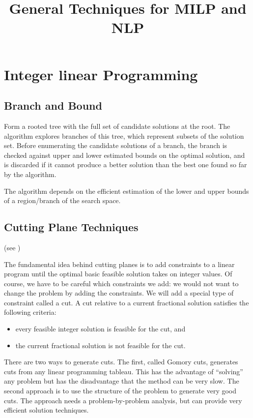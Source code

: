 \documentclass{article}
\title{\textbf{General Techniques for MILP and NLP}}
\begin{document}
\maketitle

\section{Integer linear Programming}
\subsection{Branch and Bound}
Form a rooted tree with the full set of candidate solutions at the root. The algorithm explores branches of this tree, which represent subsets of the solution set. Before enumerating the candidate solutions of a branch, the branch is checked against upper and lower estimated bounds on the optimal solution, and is discarded if it cannot produce a better solution than the best one found so far by the algorithm.

The algorithm depends on the efficient estimation of the lower and upper bounds of a region/branch of the search space.

\subsection{Cutting Plane Techniques}
(see \cite{cuttingplane98})

The fundamental idea behind cutting planes is to add constraints to a linear program until the optimal basic feasible solution takes on integer values. Of course, we have to be careful which constraints we add: we would not want to change the problem by adding the constraints. We will add a special type of constraint called a cut. A cut relative to a current fractional solution satisfies the following criteria:
\begin{itemize}
\item     every feasible integer solution is feasible for the cut, and
\item     the current fractional solution is not feasible for the cut. 
\end{itemize}

There are two ways to generate cuts. The first, called Gomory cuts, generates cuts from any linear programming tableau. This has the advantage of ``solving'' any problem but has the disadvantage that the method can be very slow. The second approach is to use the structure of the problem to generate very good cuts. The approach needs a problem-by-problem analysis, but can provide very efficient solution techniques. 
\end{document}
